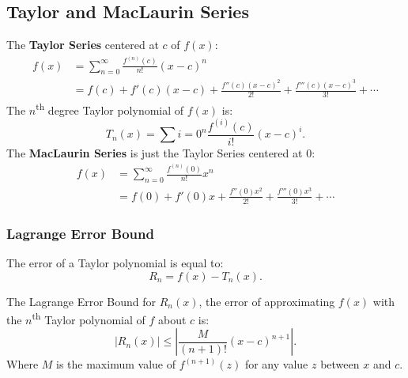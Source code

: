 \documentclass[12pt]{article}
\begin{document}
\subsection{Taylor and MacLaurin Series}
\noindent The \textbf{Taylor Series} centered at $c$ of $f(x)$:
\begin{align*}
    f(x) & = \sum_{n=0}^\infty \frac{f^{(n)}(c)}{n!} (x-c)^n                                   \\
         & = f(c) + f'(c)(x-c) + \frac{f''(c)(x-c)^2}{2!} + \frac{f'''(c)(x-c)^3}{3!} + \cdots
\end{align*}
The $n$\textsuperscript{th} degree Taylor polynomial of $f(x)$ is:
\[ T_n(x) = \sum{i=0}^n \frac{f^{(i)}(c)}{i!} (x-c)^i. \]
The \textbf{MacLaurin Series} is just the Taylor Series centered at $0$:
\begin{align*}
    f(x) & = \sum_{n=0}^\infty \frac{f^{(n)}(0)}{n!} x^n                           \\
         & = f(0) + f'(0)x + \frac{f''(0)x^2}{2!} + \frac{f'''(0)x^3}{3!} + \cdots
\end{align*}

\subsubsection{Lagrange Error Bound}
\noindent The error of a Taylor polynomial is equal to:
\[ R_n = f(x) - T_n(x). \]

\noindent The Lagrange Error Bound for $R_n(x)$, the error of approximating $f(x)$ with the $n$\textsuperscript{th} Taylor polynomial of $f$ about $c$ is:
\[ |R_n(x)| \le \left| \frac{M}{(n+1)!} (x-c)^{n+1} \right|. \]
Where $M$ is the maximum value of $f^{(n+1)}(z)$ for any value $z$ between $x$ and $c$.
\end{document}
